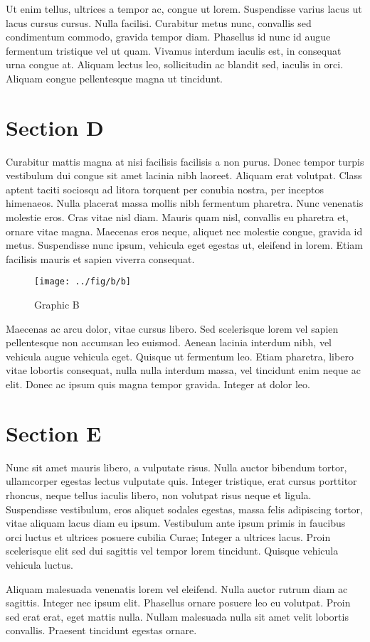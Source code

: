 Ut enim tellus, ultrices a tempor ac, congue ut lorem. Suspendisse varius lacus ut lacus cursus cursus. Nulla facilisi. Curabitur metus nunc, convallis sed condimentum commodo, gravida tempor diam. Phasellus id nunc id augue fermentum tristique vel ut quam. Vivamus interdum iaculis est, in consequat urna congue at. Aliquam lectus leo, sollicitudin ac blandit sed, iaculis in orci. Aliquam congue pellentesque magna ut tincidunt.

\section{Section D}
Curabitur mattis magna at nisi facilisis facilisis a non purus. Donec tempor turpis vestibulum dui congue sit amet lacinia nibh laoreet. Aliquam erat volutpat. Class aptent taciti sociosqu ad litora torquent per conubia nostra, per inceptos himenaeos. Nulla placerat massa mollis nibh fermentum pharetra. Nunc venenatis molestie eros. Cras vitae nisl diam. Mauris quam nisl, convallis eu pharetra et, ornare vitae magna. Maecenas eros neque, aliquet nec molestie congue, gravida id metus. Suspendisse nunc ipsum, vehicula eget egestas ut, eleifend in lorem. Etiam facilisis mauris et sapien viverra consequat.

\begin{figure}[h]
\begin{centering}
    \texttt{[image: ../fig/b/b]}
    \caption{Graphic B}
\end{centering}
\end{figure}

Maecenas ac arcu dolor, vitae cursus libero. Sed scelerisque lorem vel sapien pellentesque non accumsan leo euismod. Aenean lacinia interdum nibh, vel vehicula augue vehicula eget. Quisque ut fermentum leo. Etiam pharetra, libero vitae lobortis consequat, nulla nulla interdum massa, vel tincidunt enim neque ac elit. Donec ac ipsum quis magna tempor gravida. Integer at dolor leo.

\section{Section E}
Nunc sit amet mauris libero, a vulputate risus. Nulla auctor bibendum tortor, ullamcorper egestas lectus vulputate quis. Integer tristique, erat cursus porttitor rhoncus, neque tellus iaculis libero, non volutpat risus neque et ligula. Suspendisse vestibulum, eros aliquet sodales egestas, massa felis adipiscing tortor, vitae aliquam lacus diam eu ipsum. Vestibulum ante ipsum primis in faucibus orci luctus et ultrices posuere cubilia Curae; Integer a ultrices lacus. Proin scelerisque elit sed dui sagittis vel tempor lorem tincidunt. Quisque vehicula vehicula luctus.

Aliquam malesuada venenatis lorem vel eleifend. Nulla auctor rutrum diam ac sagittis. Integer nec ipsum elit. Phasellus ornare posuere leo eu volutpat. Proin sed erat erat, eget mattis nulla. Nullam malesuada nulla sit amet velit lobortis convallis. Praesent tincidunt egestas ornare.
